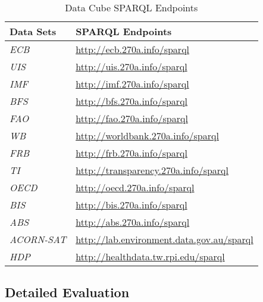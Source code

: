 \documentclass{llncs}
\begin{document}
\begin{table}[H]
	\centering
		\begin{tabular}{l|l}
      \textbf{Data Sets} & \textbf{SPARQL Endpoints} \\		
      \hline
      \emph{ECB} & \url{http://ecb.270a.info/sparql} \\
			\emph{UIS} & \url{http://uis.270a.info/sparql} \\
			\emph{IMF} & \url{http://imf.270a.info/sparql} \\
			\emph{BFS} & \url{http://bfs.270a.info/sparql} \\
			\emph{FAO} & \url{http://fao.270a.info/sparql} \\
			\emph{WB} & \url{http://worldbank.270a.info/sparql} \\
			\emph{FRB} & \url{http://frb.270a.info/sparql} \\
			\emph{TI} & \url{http://transparency.270a.info/sparql} \\
			\emph{OECD} & \url{http://oecd.270a.info/sparql} \\
			\emph{BIS} & \url{http://bis.270a.info/sparql} \\
			\emph{ABS} & \url{http://abs.270a.info/sparql} \\
			\emph{ACORN-SAT} & \url{http://lab.environment.data.gov.au/sparql} \\
			\emph{HDP} & \url{http://healthdata.tw.rpi.edu/sparql} \\
		\end{tabular}
	\caption{Data Cube SPARQL Endpoints}
	\label{tab:data-cube-sparql-endpoints}
\end{table}

\subsection{Detailed Evaluation}
\end{document}

